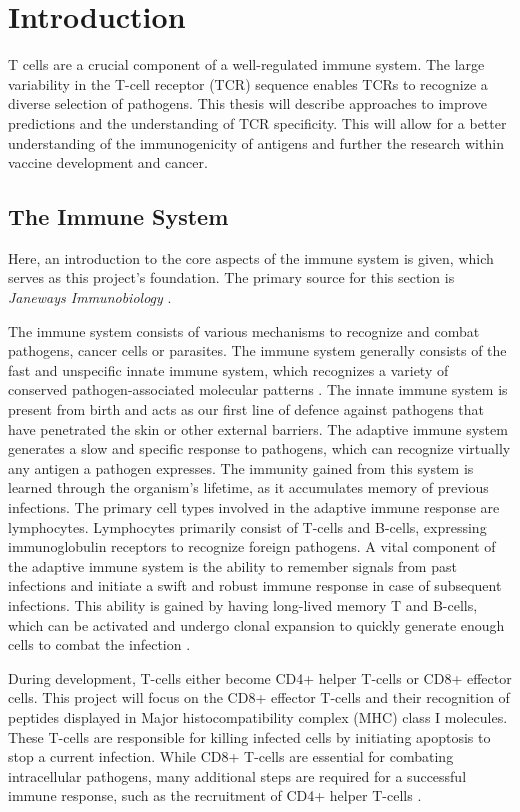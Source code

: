 \section{Introduction} \label{introduction}
T cells are a crucial component of a well-regulated immune system. The large variability in the T-cell receptor (TCR) sequence enables TCRs to recognize a diverse selection of pathogens. This thesis will describe approaches to improve predictions and the understanding of TCR specificity. This will allow for a better understanding of the immunogenicity of antigens and further the research within vaccine development and cancer.

\subsection{The Immune System}
Here, an introduction to the core aspects of the immune system is given, which serves as this project's foundation. The primary source for this section is \textit{Janeways Immunobiology} \cite{Murphy2008JanewaysImmunobiology}.

The immune system consists of various mechanisms to recognize and combat pathogens, cancer cells or parasites. The immune system generally consists of the fast and unspecific innate immune system, which recognizes a variety of conserved pathogen-associated molecular patterns \cite{Gasteiger2017CellularPlayers}. The innate immune system is present from birth and acts as our first line of defence against pathogens that have penetrated the skin or other external barriers. The adaptive immune system generates a slow and specific response to pathogens, which can recognize virtually any antigen a pathogen expresses. The immunity gained from this system is learned through the organism's lifetime, as it accumulates memory of previous infections. The primary cell types involved in the adaptive immune response are lymphocytes. Lymphocytes primarily consist of T-cells and B-cells, expressing immunoglobulin receptors to recognize foreign pathogens. A vital component of the adaptive immune system is the ability to remember signals from past infections and initiate a swift and robust immune response in case of subsequent infections. This ability is gained by having long-lived memory T and B-cells, which can be activated and undergo clonal expansion to quickly generate enough cells to combat the infection \cite{Murphy2008JanewaysImmunobiology}. 

During development, T-cells either become CD4+ helper T-cells or CD8+ effector cells. This project will focus on the CD8+ effector T-cells and their recognition of peptides displayed in Major histocompatibility complex (MHC) class I molecules. These T-cells are responsible for killing infected cells by initiating apoptosis to stop a current infection. While CD8+ T-cells are essential for combating intracellular pathogens, many additional steps are required for a successful immune response, such as the recruitment of CD4+ helper T-cells \cite{Chaplin2010OverviewResponse}.

